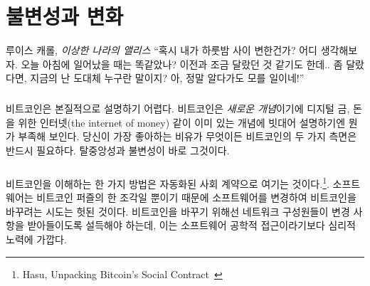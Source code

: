 \chapter{불변성과 변화}
\label{les:1}

\begin{chapquote}{루이스 캐롤, \textit{이상한 나라의 앨리스}}
	\enquote{혹시 내가 하룻밤 사이 변한건가? 어디 생각해보자.
		오늘 아침에 일어났을 때는 똑같았나? 이전과 조금 달랐던 것 같기도 한데.. 
		좀 달랐다면, 지금의 난 도대체 누구란 말이지? 아, 정말 알다가도 모를 일이네!}
\end{chapquote}

\paragraph{}
비트코인은 본질적으로 설명하기 어렵다. 
비트코인은 \textit{새로운 개념}이기에 디지털 금, 돈을 위한 인터넷(the internet of money) 같이 이미 있는 개념에 빗대어 설명하기엔 뭔가 부족해 보인다. 
당신이 가장 좋아하는 비유가 무엇이든 비트코인의 두 가지 측면은 반드시 필요하다. 탈중앙성과 불변성이 바로 그것이다.

\paragraph{}
비트코인을 이해하는 한 가지 방법은 자동화된 사회 계약으로 여기는 것이다.\footnote{Hasu, Unpacking Bitcoin's Social Contract~\cite{social-contract}}. 
소프트웨어는 비트코인 퍼즐의 한 조각일 뿐이기 때문에 소프트웨어를 변경하여 비트코인을 바꾸려는 시도는 헛된 것이다.
비트코인을 바꾸기 위해선 네트워크 구성원들이 변경 사항을 받아들이도록 설득해야 하는데, 이는 소프트웨어 공학적 접근이라기보다 심리적 노력에 가깝다.

